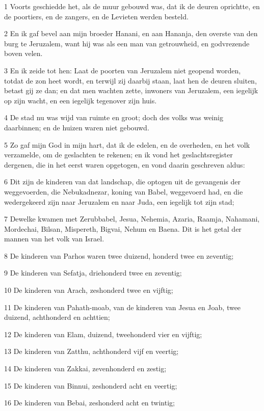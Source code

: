 \par 1 Voorts geschiedde het, als de muur gebouwd was, dat ik de deuren oprichtte, en de poortiers, en de zangers, en de Levieten werden besteld.
\par 2 En ik gaf bevel aan mijn broeder Hanani, en aan Hananja, den overste van den burg te Jeruzalem, want hij was als een man van getrouwheid, en godvrezende boven velen.
\par 3 En ik zeide tot hen: Laat de poorten van Jeruzalem niet geopend worden, totdat de zon heet wordt, en terwijl zij daarbij staan, laat hen de deuren sluiten, betast gij ze dan; en dat men wachten zette, inwoners van Jeruzalem, een iegelijk op zijn wacht, en een iegelijk tegenover zijn huis.
\par 4 De stad nu was wijd van ruimte en groot; doch des volks was weinig daarbinnen; en de huizen waren niet gebouwd.
\par 5 Zo gaf mijn God in mijn hart, dat ik de edelen, en de overheden, en het volk verzamelde, om de geslachten te rekenen; en ik vond het geslachtsregister dergenen, die in het eerst waren opgetogen, en vond daarin geschreven aldus:
\par 6 Dit zijn de kinderen van dat landschap, die optogen uit de gevangenis der weggevoerden, die Nebukadnezar, koning van Babel, weggevoerd had, en die wedergekeerd zijn naar Jeruzalem en naar Juda, een iegelijk tot zijn stad;
\par 7 Dewelke kwamen met Zerubbabel, Jesua, Nehemia, Azaria, Raamja, Nahamani, Mordechai, Bilsan, Mispereth, Bigvai, Nehum en Baena. Dit is het getal der mannen van het volk van Israel.
\par 8 De kinderen van Parhos waren twee duizend, honderd twee en zeventig;
\par 9 De kinderen van Sefatja, driehonderd twee en zeventig;
\par 10 De kinderen van Arach, zeshonderd twee en vijftig;
\par 11 De kinderen van Pahath-moab, van de kinderen van Jesua en Joab, twee duizend, achthonderd en achttien;
\par 12 De kinderen van Elam, duizend, tweehonderd vier en vijftig;
\par 13 De kinderen van Zatthu, achthonderd vijf en veertig;
\par 14 De kinderen van Zakkai, zevenhonderd en zestig;
\par 15 De kinderen van Binnui, zeshonderd acht en veertig;
\par 16 De kinderen van Bebai, zeshonderd acht en twintig;

